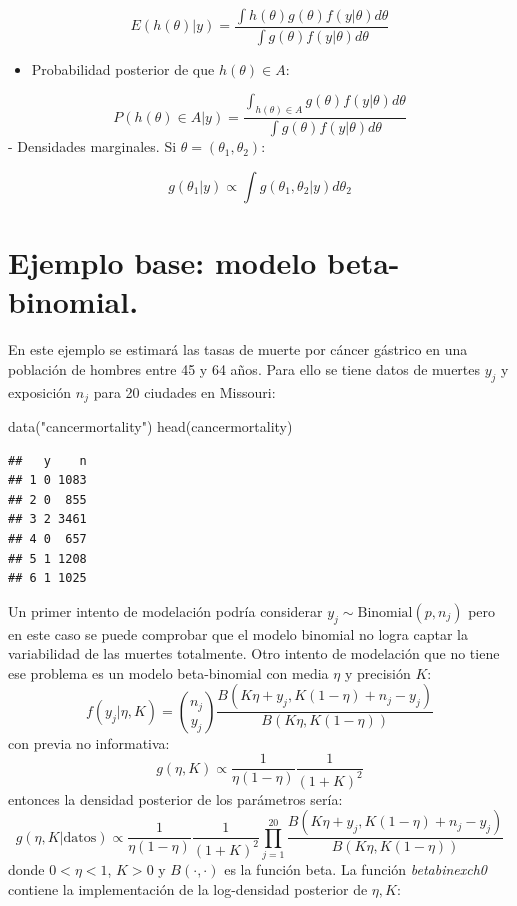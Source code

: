 \documentclass[
  12pt,
]{book}
\newenvironment{Shaded}{\begin{snugshade}}{\end{snugshade}}
\newcommand{\FunctionTok}[1]{\textcolor[rgb]{0.00,0.00,0.00}{#1}}
\newcommand{\NormalTok}[1]{#1}
\newcommand{\StringTok}[1]{\textcolor[rgb]{0.31,0.60,0.02}{#1}}
\providecommand{\tightlist}{%
  \setlength{\itemsep}{0pt}\setlength{\parskip}{0pt}}
\theoremstyle{definition}
\theoremstyle{definition}
\theoremstyle{definition}
\theoremstyle{definition}
\theoremstyle{remark}
\begin{document}
\[E(h(\theta)|y)=\frac{\int h(\theta)g(\theta)f(y|\theta) d\theta}{\int g(\theta)f(y|\theta) d\theta}\]

\begin{itemize}
\tightlist
\item
  Probabilidad posterior de que \(h(\theta) \in A\):
\end{itemize}

\[P(h(\theta) \in A|y)=\frac{\int_{h(\theta) \in A} g(\theta)f(y|\theta) d\theta}{\int g(\theta)f(y|\theta) d\theta}\]
- Densidades marginales. Si \(\theta=(\theta_1,\theta_2)\):

\[g(\theta_1|y)\propto \int g(\theta_1,\theta_2|y)d\theta_2\]

\hypertarget{ejemplo-base-modelo-beta-binomial.}{%
\section{Ejemplo base: modelo beta-binomial.}\label{ejemplo-base-modelo-beta-binomial.}}

En este ejemplo se estimará las tasas de muerte por cáncer gástrico en una población de hombres entre 45 y 64 años. Para ello se tiene datos de muertes \(y_j\) y exposición \(n_j\) para 20 ciudades en Missouri:

\begin{Shaded}
\begin{Highlighting}[]
\FunctionTok{data}\NormalTok{(}\StringTok{"cancermortality"}\NormalTok{)}
\FunctionTok{head}\NormalTok{(cancermortality)}
\end{Highlighting}
\end{Shaded}

\begin{verbatim}
##   y    n
## 1 0 1083
## 2 0  855
## 3 2 3461
## 4 0  657
## 5 1 1208
## 6 1 1025
\end{verbatim}

Un primer intento de modelación podría considerar \(y_j\sim \text{Binomial}(p,n_j)\) pero en este caso se puede comprobar que el modelo binomial no logra captar la variabilidad de las muertes totalmente. Otro intento de modelación que no tiene ese problema es un modelo beta-binomial con media \(\eta\) y precisión \(K\):
\[f(y_j|\eta,K)={n_j \choose y_j}\frac{B(K\eta+y_j,K(1-\eta)+n_j-y_j)}{B(K\eta,K(1-\eta))}\]
con previa no informativa:
\[g(\eta,K)\propto \frac{1}{\eta(1-\eta)}\frac{1}{(1+K)^2}\]
entonces la densidad posterior de los parámetros sería:
\[g(\eta,K|\text{datos})\propto \frac{1}{\eta(1-\eta)}\frac{1}{(1+K)^2} \prod_{j=1}^{20}\frac{B(K\eta+y_j,K(1-\eta)+n_j-y_j)}{B(K\eta,K(1-\eta))}\]
donde \(0<\eta<1\), \(K>0\) y \(B(\cdot,\cdot)\) es la función beta. La función \emph{betabinexch0} contiene la implementación de la log-densidad posterior de \(\eta,K\):
\end{document}
